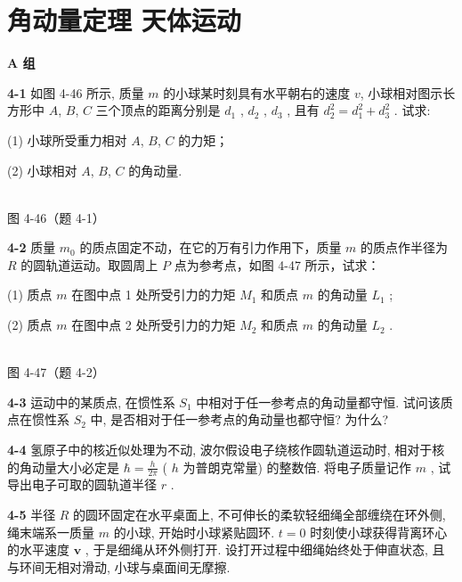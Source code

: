 \chapter{角动量定理 天体运动}
\begin{center}\textbf{A 组}\end{center}

\textbf{4-1} 如图 4-46 所示, 质量 $m$ 的小球某时刻具有水平朝右的速度 $v$, 小球相对图示长方形中 $A$, $B$, $C$ 三个顶点的距离分别是 $d_{1}$ , $d_{2}$ , $d_{3}$ , 且有 $d_{2}^{2}=d_{1}^{2}+d_{3}^{2}$ . 试求:

(1) 小球所受重力相对 $A$, $B$, $C$ 的力矩；

(2) 小球相对 $A$, $B$, $C$ 的角动量.

\begin{center}
\resizebox{0.50\textwidth}{!}{}\\[4pt]
{\small 图 4-46（题 4-1）}
\end{center}

\newpage

\textbf{4-2} 质量 $m_{0}$ 的质点固定不动，在它的万有引力作用下，质量 $m$ 的质点作半径为 $R$ 的圆轨道运动。取圆周上 $P$ 点为参考点，如图 4-47 所示，试求：

(1) 质点 $m$ 在图中点 1 处所受引力的力矩 $M_{1}$ 和质点 $m$ 的角动量 $L_{1}$ ;

(2) 质点 $m$ 在图中点 2 处所受引力的力矩 $M_{2}$ 和质点 $m$ 的角动量 $L_{2}$ .

\begin{center}
\resizebox{0.41\textwidth}{!}{}\\[4pt]
{\small 图 4-47（题 4-2）}
\end{center}

\newpage

\textbf{4-3} 运动中的某质点, 在惯性系 $S_{1}$ 中相对于任一参考点的角动量都守恒. 试问该质点在惯性系 $S_{2}$ 中, 是否相对于任一参考点的角动量也都守恒? 为什么?

\newpage

\textbf{4-4} 氢原子中的核近似处理为不动, 波尔假设电子绕核作圆轨道运动时, 相对于核的角动量大小必定是 $\hbar = \frac{h}{2\pi}$ ( $h$ 为普朗克常量) 的整数倍. 将电子质量记作 $m$ , 试导出电子可取的圆轨道半径 $r$ .

\newpage

\textbf{4-5} 半径 $R$ 的圆环固定在水平桌面上, 不可伸长的柔软轻细绳全部缠绕在环外侧, 绳末端系一质量 $m$ 的小球, 开始时小球紧贴圆环. $t = 0$ 时刻使小球获得背离环心的水平速度 $\pmb{v}$ , 于是细绳从环外侧打开. 设打开过程中细绳始终处于伸直状态, 且与环间无相对滑动, 小球与桌面间无摩擦.

